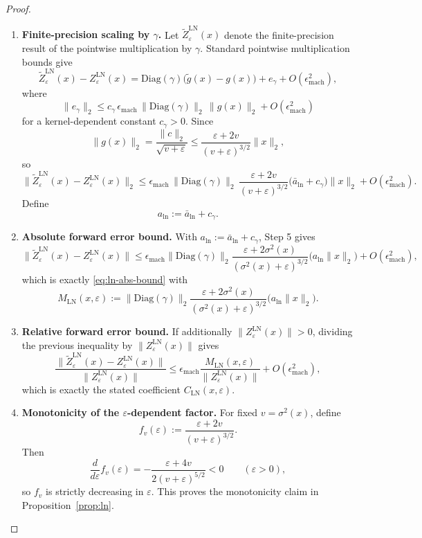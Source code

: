 \documentclass[twoside]{article}
\theoremstyle{definition}
\theoremstyle{remark}
\begin{document}
\begin{proof}
\begin{enumerate}
  \item \textbf{Finite-precision scaling by \texorpdfstring{$\gamma$}{gamma}.}
  Let $\widetilde{Z}^{\mathrm{LN}}_\varepsilon(x)$ denote the finite-precision
  result of the pointwise multiplication by $\gamma$. Standard pointwise
  multiplication bounds give
  \[
  \widetilde{Z}^{\mathrm{LN}}_\varepsilon(x)-Z^{\mathrm{LN}}_\varepsilon(x)
  =
  \mathrm{Diag}(\gamma)\bigl(\widetilde{g}(x)-g(x)\bigr)
  + e_\gamma
  + O(\epsilon_{\mathrm{mach}}^2),
  \]
  where
  \[
  \|e_\gamma\|_2
  \le
  c_\gamma\,\epsilon_{\mathrm{mach}}\,
  \|\mathrm{Diag}(\gamma)\|_2\,\|g(x)\|_2
  + O(\epsilon_{\mathrm{mach}}^2)
  \]
  for a kernel-dependent constant $c_\gamma>0$. Since
  \[
  \|g(x)\|_2
  =
  \frac{\|c\|_2}{\sqrt{v+\varepsilon}}
  \le
  \frac{\varepsilon+2v}{(v+\varepsilon)^{3/2}}
  \|x\|_2,
  \]
  so
  \[
  \|\widetilde{Z}^{\mathrm{LN}}_\varepsilon(x)-Z^{\mathrm{LN}}_\varepsilon(x)\|_2
  \le
  \epsilon_{\mathrm{mach}}\,
  \|\mathrm{Diag}(\gamma)\|_2\,
  \frac{\varepsilon+2v}{(v+\varepsilon)^{3/2}}
  \bigl(\bar a_{\mathrm{ln}}+c_\gamma\bigr)\|x\|_2
  + O(\epsilon_{\mathrm{mach}}^2).
  \]
  Define
  \[
  a_{\mathrm{ln}}:=\bar a_{\mathrm{ln}}+c_\gamma.
  \]

  \item \textbf{Absolute forward error bound.}
  With $a_{\mathrm{ln}}:=\bar a_{\mathrm{ln}}+c_\gamma$, Step 5 gives
  \[
  \|\widetilde{Z}^{\mathrm{LN}}_\varepsilon(x)-Z^{\mathrm{LN}}_\varepsilon(x)\|
  \le
  \epsilon_{\mathrm{mach}}
  \|\mathrm{Diag}(\gamma)\|_2
  \frac{\varepsilon+2\sigma^2(x)}{(\sigma^2(x)+\varepsilon)^{3/2}}
  \bigl(a_{\mathrm{ln}}\|x\|_2\bigr)
  + O(\epsilon_{\mathrm{mach}}^2),
  \]
  which is exactly \eqref{eq:ln-abs-bound} with
  \[
  M_{\mathrm{LN}}(x,\varepsilon)
  :=
  \|\mathrm{Diag}(\gamma)\|_2
  \frac{\varepsilon+2\sigma^2(x)}{(\sigma^2(x)+\varepsilon)^{3/2}}
  \bigl(a_{\mathrm{ln}}\|x\|_2\bigr).
  \]

  \item \textbf{Relative forward error bound.}
  If additionally $\|Z^{\mathrm{LN}}_\varepsilon(x)\|>0$, dividing the previous
  inequality by $\|Z^{\mathrm{LN}}_\varepsilon(x)\|$ gives
  \[
  \frac{\|\widetilde{Z}^{\mathrm{LN}}_\varepsilon(x)-Z^{\mathrm{LN}}_\varepsilon(x)\|}{\|Z^{\mathrm{LN}}_\varepsilon(x)\|}
  \le
  \epsilon_{\mathrm{mach}}
  \frac{M_{\mathrm{LN}}(x,\varepsilon)}{\|Z^{\mathrm{LN}}_\varepsilon(x)\|}
  + O(\epsilon_{\mathrm{mach}}^2),
  \]
  which is exactly the stated coefficient $C_{\mathrm{LN}}(x,\varepsilon)$.

  \item \textbf{Monotonicity of the $\varepsilon$-dependent factor.}
  For fixed $v=\sigma^2(x)$, define
  \[
  f_v(\varepsilon)
  :=
  \frac{\varepsilon+2v}{(v+\varepsilon)^{3/2}}.
  \]
  Then
  \[
  \frac{d}{d\varepsilon}f_v(\varepsilon)
  =
  -\frac{\varepsilon+4v}{2(v+\varepsilon)^{5/2}}
  < 0
  \qquad (\varepsilon>0),
  \]
  so $f_v$ is strictly decreasing in $\varepsilon$. This proves the monotonicity claim in Proposition~\ref{prop:ln}.
\end{enumerate}
\end{proof}
\end{document}
